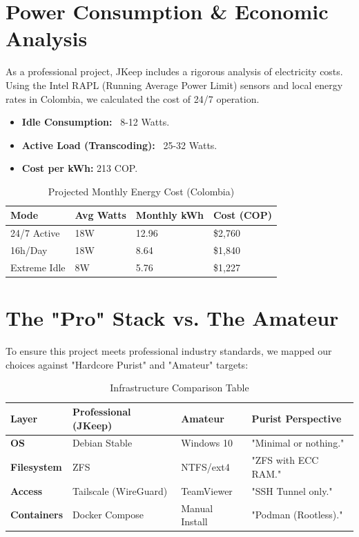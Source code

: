 \documentclass[12pt,a4paper,oneside]{book}
\begin{document}
\section{Power Consumption \& Economic Analysis}
As a professional project, JKeep includes a rigorous analysis of electricity costs. Using the Intel RAPL (Running Average Power Limit) sensors and local energy rates in Colombia, we calculated the cost of 24/7 operation.

\begin{itemize}
    \item \textbf{Idle Consumption:} ~8-12 Watts.
    \item \textbf{Active Load (Transcoding):} ~25-32 Watts.
    \item \textbf{Cost per kWh:} 213 COP.
\end{itemize}

\begin{table}[h]
\centering
\caption{Projected Monthly Energy Cost (Colombia)}
\begin{tabular}{@{}llll@{}}
\toprule
Mode & Avg Watts & Monthly kWh & Cost (COP) \\ \midrule
24/7 Active & 18W & 12.96 & \$2,760 \\
16h/Day & 18W & 8.64 & \$1,840 \\
Extreme Idle & 8W & 5.76 & \$1,227 \\ \bottomrule
\end{tabular}
\end{table}

\section{The "Pro" Stack vs. The Amateur}
To ensure this project meets professional industry standards, we mapped our choices against "Hardcore Purist" and "Amateur" targets:

\begin{longtable}{@{}llll@{}}
\caption{Infrastructure Comparison Table} \\ \toprule
Layer & Professional (JKeep) & Amateur & Purist Perspective \\ \midrule
\textbf{OS} & Debian Stable & Windows 10 & "Minimal or nothing." \\
\textbf{Filesystem} & ZFS & NTFS/ext4 & "ZFS with ECC RAM." \\
\textbf{Access} & Tailscale (WireGuard) & TeamViewer & "SSH Tunnel only." \\
\textbf{Containers} & Docker Compose & Manual Install & "Podman (Rootless)." \\ \bottomrule
\end{longtable}
\end{document}
